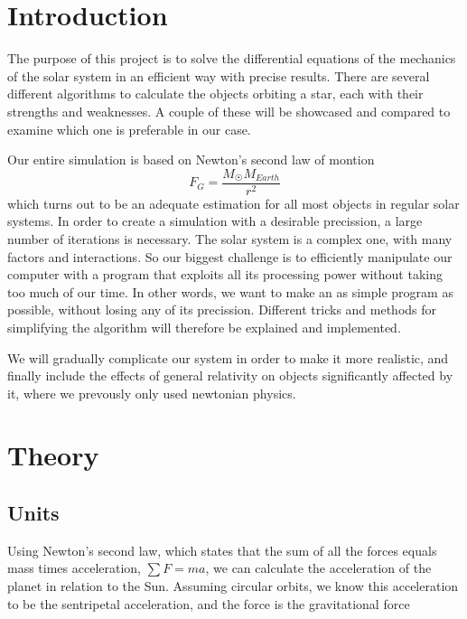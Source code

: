 \documentclass[10pt]{article}
\begin{document}
\begin{multicols}{2}
\tableofcontents

{}

\section{Introduction}
The purpose of this project is to solve the differential equations of the
mechanics of the solar system in an efficient way with precise results. There are several different algorithms to calculate the objects orbiting a star, each with their strengths and weaknesses. A couple of these will be showcased and compared to examine which one is preferable in our case.

Our entire simulation is based on Newton's second law of montion
\begin{equation}
    F_G = \frac{M_\Sun M_{Earth}}{r^2}
\end{equation}
which turns out to be an adequate estimation for all most objects in regular solar systems. In order to create a simulation with a desirable precission, a large number of iterations is necessary. The solar system is a complex one, with many factors and interactions. So our biggest challenge is to efficiently manipulate our computer with a program that exploits all its processing power without taking too much of our time. In other words, we want to make an as simple program as possible, without losing any of its precission. Different tricks and methods for simplifying the algorithm will therefore be explained and implemented. 

We will gradually complicate our system in order to make it more realistic, and finally include the effects of general relativity on objects significantly affected by it, where we prevously only used newtonian physics.

\section{Theory}
\subsection{Units}
Using Newton's second law, which states that the sum of all the forces
equals mass times acceleration, $\sum F=ma$, we can calculate the
acceleration of the planet in relation to the Sun. Assuming circular
orbits, we know this acceleration to be the sentripetal acceleration, and
the force is the gravitational force


\end{multicols}
\end{document}
